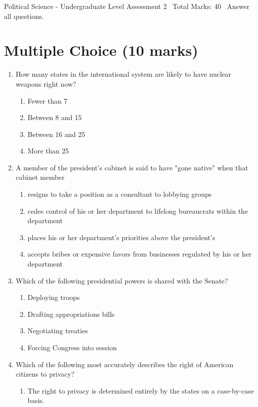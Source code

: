 \documentclass[12pt]{article}
\begin{document}
\begin{center}
Political Science - Undergraduate Level Assessment 2 \
Total Marks: 40 \
Answer all questions.
\end{center}

\section*{Multiple Choice (10 marks)}
\begin{enumerate}[label=\arabic*.]
\item How many states in the international system are likely to have nuclear weapons right now?
\begin{enumerate}[label=(\alph*)]
    \item Fewer than 7
    \item Between 8 and 15
    \item Between 16 and 25
    \item More than 25
\end{enumerate}
\item A member of the president's cabinet is said to have "gone native" when that cabinet member
\begin{enumerate}[label=(\alph*)]
    \item resigns to take a position as a consultant to lobbying groups
    \item cedes control of his or her department to lifelong bureaucrats within the department
    \item places his or her department's priorities above the president's
    \item accepts bribes or expensive favors from businesses regulated by his or her department
\end{enumerate}
\item Which of the following presidential powers is shared with the Senate?
\begin{enumerate}[label=(\alph*)]
    \item Deploying troops
    \item Drafting appropriations bills
    \item Negotiating treaties
    \item Forcing Congress into session
\end{enumerate}
\item Which of the following most accurately describes the right of American citizens to privacy?
\begin{enumerate}[label=(\alph*)]
    \item The right to privacy is determined entirely by the states on a case-by-case basis.

\end{enumerate}
\end{enumerate}
\end{document}
